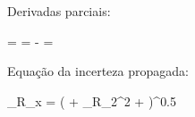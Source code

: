 
            Derivadas parciais:

             = 
 = - 
 = 

            Equação da incerteza propagada:

            \sigma_R_x = \left( +  \sigma_R_2^{2} + \right)^{0.5}
